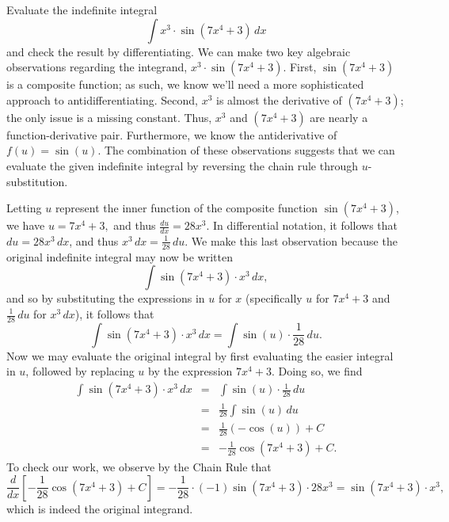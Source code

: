 \bex \label{Ex:5.3.usub}
Evaluate the indefinite integral
$$\int x^3 \cdot \sin (7x^4 + 3) \, dx$$
and check the result by differentiating.
\eex
We can make two key algebraic observations regarding the integrand, $x^3 \cdot \sin (7x^4 + 3)$.  First, $\sin (7x^4 + 3)$ is a composite function; as such, we know we'll need a more sophisticated approach to antidifferentiating.  Second, $x^3$ is almost the derivative of $(7x^4 + 3)$; the only issue is a missing constant.  Thus, $x^3$ and $(7x^4 + 3)$ are nearly a function-derivative pair.  Furthermore, we know the antiderivative of $f(u) = \sin(u)$.  The combination of these observations suggests that we can evaluate the given indefinite integral by reversing the chain rule through $u$-substitution.

Letting $u$ represent the inner function of the composite function $\sin (7x^4 + 3)$, we have $u = 7x^4 + 3,$
and thus $\frac{du}{dx} = 28x^3.$  In differential notation, it follows that $du = 28x^3 \, dx$, and thus $x^3 \, dx = \frac{1}{28} \, du$.  We make this last observation because the original indefinite integral may now be written 
$$\int \sin (7x^4 + 3) \cdot x^3 \, dx,$$
and so by substituting the expressions in $u$ for $x$ (specifically $u$ for $7x^4 + 3$ and $\frac{1}{28} \, du$ for $x^3 \, dx$), it follows that
$$\int \sin (7x^4 + 3) \cdot x^3 \, dx = \int \sin(u) \cdot \frac{1}{28} \, du.$$
Now we may evaluate the original integral by first evaluating the easier integral in $u$, followed by replacing $u$ by the expression $7x^4 + 3$.  Doing so, we find
\begin{eqnarray*}
\int \sin (7x^4 + 3) \cdot x^3 \, dx & = & \int \sin(u) \cdot \frac{1}{28} \, du \\
						& = & \frac{1}{28} \int \sin(u) \, du \\
						& = & \frac{1}{28} (-\cos(u)) + C \\
						& = & -\frac{1}{28} \cos(7x^4 + 3) + C.
\end{eqnarray*}
To check our work, we observe by the Chain Rule that
$$\frac{d}{dx} \left[ -\frac{1}{28}\cos(7x^4 + 3) + C \right] = -\frac{1}{28} \cdot (-1)\sin(7x^4 + 3) \cdot 28x^3 = \sin(7x^4 + 3) \cdot x^3,$$
which is indeed the original integrand.
\afterex

